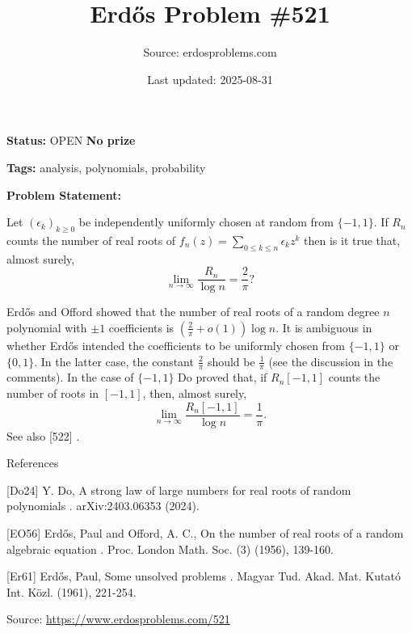 \documentclass{article}
\title{Erd\H{o}s Problem \#521}
\date{Last updated: 2025-08-31}
\author{Source: erdosproblems.com}
\begin{document}
\maketitle

\noindent\textbf{Status:} OPEN \quad \textbf{No prize}

\noindent\textbf{Tags:} analysis, polynomials, probability

\medskip

\noindent\textbf{Problem Statement:}

Let $(\epsilon_k)_{k\geq 0}$ be independently uniformly chosen at random from $\{-1,1\}$. If $R_n$ counts the number of real roots of $f_n(z)=\sum_{0\leq k\leq n}\epsilon_k z^k$ then is it true that, almost surely,\[\lim_{n\to \infty}\frac{R_n}{\log n}=\frac{2}{\pi}?\]




Erd\H{o}s and Offord \cite{EO56} showed that the number of real roots of a random degree $n$ polynomial with $\pm 1$ coefficients is $(\frac{2}{\pi}+o(1))\log n$. It is ambiguous in \cite{Er61} whether Erd\H{o}s intended the coefficients to be uniformly chosen from $\{-1,1\}$ or $\{0,1\}$. In the latter case, the constant $\frac{2}{\pi}$ should be $\frac{1}{\pi}$ (see the discussion in the comments). In the case of $\{-1,1\}$ Do \cite{Do24} proved that, if $R_n[-1,1]$ counts the number of roots in $[-1,1]$, then, almost surely,\[\lim_{n\to \infty}\frac{R_n[-1,1]}{\log n}=\frac{1}{\pi}.\]See also [522] .




References

[Do24] Y. Do, A strong law of large numbers for real roots of random polynomials . arXiv:2403.06353 (2024).

[EO56] Erd\H{o}s, Paul and Offord, A. C., On the number of real roots of a random algebraic equation . Proc. London Math. Soc. (3) (1956), 139-160.

[Er61] Erd\H{o}s, Paul, Some unsolved problems . Magyar Tud. Akad. Mat. Kutat\'{o} Int. K\"{o}zl. (1961), 221-254.


\bigskip
\noindent\small{Source: \url{https://www.erdosproblems.com/521}}
\end{document}
